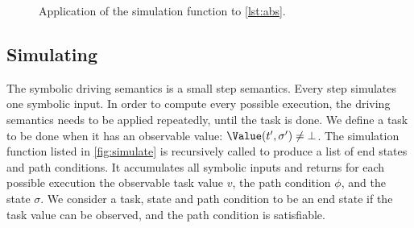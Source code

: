 \begin{figure*}
\caption{Application of the simulation function to \cref{lst:abs}.}
\label{diagram:simapp}
\end{figure*}



\subsection{Simulating}
\label{subsec:driving}

The symbolic driving semantics is a small step semantics.
Every step simulates one symbolic input.
In order to compute every possible execution, the driving semantics needs to be applied repeatedly, until the task is done.
We define a task to be done when it has an observable value: $\Value(t', \sigma') \neq \bot$.
The simulation function listed in \cref{fig:simulate} is recursively called to produce a list of end states and path conditions.
It accumulates all symbolic inputs and returns for each possible execution the observable task value $v$, the path condition $\phi$, and the state $\sigma$.
We consider a task, state and path condition to be an end state if the task value can be observed, and the path condition is satisfiable.

